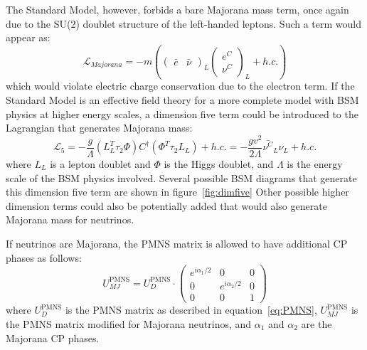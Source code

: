 \documentclass[/main.tex]{subfiles}
\begin{document}
The Standard Model, however, forbids a bare Majorana mass term, once again due to the SU(2) doublet structure of the left-handed leptons.
Such a term would appear as:
\begin{equation}
  \mathcal{L}_{Majorana}=-m(\begin{pmatrix}\bar e & \bar\nu\end{pmatrix}_L\begin{pmatrix}e^C \\ \nu^C\end{pmatrix}_L + h.c.)
\end{equation}
which would violate electric charge conservation due to the electron term.
If the Standard Model is an effective field theory for a more complete model with BSM physics at higher energy scales, a dimension five term could be introduced to the Lagrangian that generates Majorana mass:
\begin{equation} \label{eq:dimfive}
  \mathcal{L}_5= -\frac{g}{\Lambda}(L^T_L\tau_2\Phi)C^\dagger(\Phi^T\tau_2L_L) + h.c. = -\frac{gv^2}{2\Lambda}\bar{\nu^C}_L\nu_L + h.c.
\end{equation}
where $L_L$ is a lepton doublet and $\Phi$ is the Higgs doublet, and $\Lambda$ is the energy scale of the BSM physics involved.
Several possible BSM diagrams that generate this dimension five term are shown in figure~\ref{fig:dimfive}
Other possible higher dimension terms could also be potentially added that would also generate Majorana mass for neutrinos.

If neutrinos are Majorana, the PMNS matrix is allowed to have additional CP phases as follows:
\begin{equation}
  U^{\mathrm{PMNS}}_{MJ}=U^{\mathrm{PMNS}}_D\cdot\begin{pmatrix}
    e^{i\alpha_1/2} & 0 & 0 \\
    0 & e^{i\alpha_2/2} & 0 \\
    0 & 0 & 1
  \end{pmatrix}
\end{equation}
where $U^{\mathrm{PMNS}}_D$ is the PMNS matrix as described in equation~\ref{eq:PMNS}, $U^{\mathrm{PMNS}}_{MJ}$ is the PMNS matrix modified for Majorana neutrinos, and $\alpha_1$ and $\alpha_2$ are the Majorana CP phases.
\end{document}
